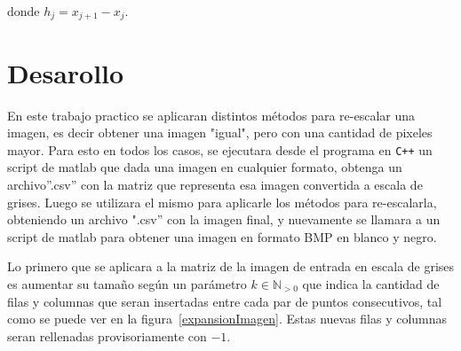 \documentclass[a4paper]{article}
\newcounter{col}
\begin{document}
donde $h_j=x_{j+1}-x_j$.


\newpage 

\section{Desarollo}

En este trabajo practico se aplicaran distintos métodos para re-escalar una imagen, es decir obtener una imagen "igual", pero con una cantidad de pixeles mayor. Para esto en todos los casos, se ejecutara desde el programa en \verb-C++- un script de matlab que dada una imagen en cualquier formato, obtenga un archivo''.csv'' con la matriz que representa esa imagen convertida a escala de grises. Luego se utilizara el mismo para aplicarle los métodos para re-escalarla, obteniendo un archivo ".csv'' con la imagen final, y nuevamente se llamara a un script de matlab para obtener una imagen en formato BMP en blanco y negro.

Lo primero que se aplicara a la matriz de la imagen de entrada en escala de grises es aumentar su tamaño según un parámetro $k \in \mathbb{N}_{>0}$ que indica la cantidad de filas y columnas que seran insertadas entre cada par de puntos consecutivos, tal como se puede ver en la figura~\ref{expansionImagen}. Estas nuevas filas y columnas seran rellenadas provisoriamente con $ -1 $.
\end{document}
